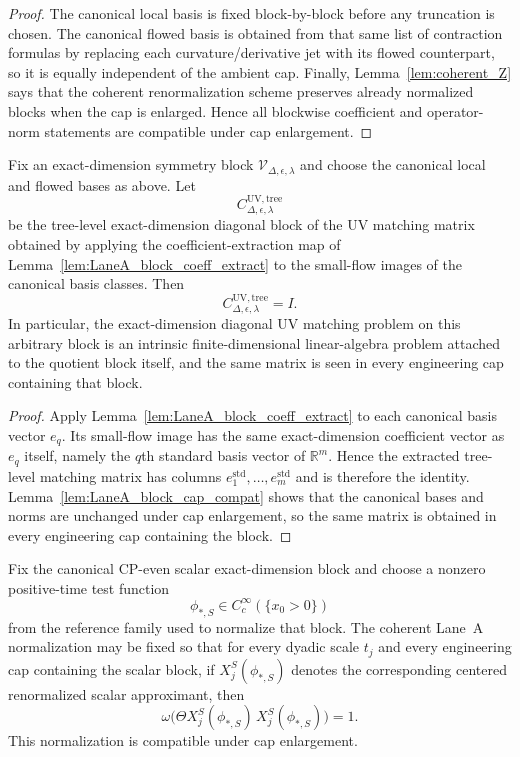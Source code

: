 \begin{proof}
The canonical local basis is fixed block-by-block before any truncation is chosen.
The canonical flowed basis is obtained from that same list of contraction formulas by replacing each curvature/derivative jet with its flowed counterpart, so it is equally independent of the ambient cap.
Finally, Lemma~\ref{lem:coherent_Z} says that the coherent renormalization scheme preserves already normalized blocks when the cap is enlarged.
Hence all blockwise coefficient and operator-norm statements are compatible under cap enlargement.
\end{proof}

\begin{theorem}\label{thm:LaneA_block_coefficient_theorem}
Fix an exact-dimension symmetry block $\mathscr V_{\Delta,\epsilon,\lambda}$ and choose the canonical local and flowed bases as above.
Let
\[
C^{\mathrm{UV,tree}}_{\Delta,\epsilon,\lambda}
\]
be the tree-level exact-dimension diagonal block of the UV matching matrix obtained by applying the coefficient-extraction map of
Lemma~\ref{lem:LaneA_block_coeff_extract} to the small-flow images of the canonical basis classes.
Then
\[
C^{\mathrm{UV,tree}}_{\Delta,\epsilon,\lambda}=I.
\]
In particular, the exact-dimension diagonal UV matching problem on this arbitrary block is an intrinsic finite-dimensional linear-algebra problem attached to the quotient block itself,
and the same matrix is seen in every engineering cap containing that block.
\end{theorem}

\begin{proof}
Apply Lemma~\ref{lem:LaneA_block_coeff_extract} to each canonical basis vector $e_q$.
Its small-flow image has the same exact-dimension coefficient vector as $e_q$ itself, namely the $q$th standard basis vector of $\mathbb R^m$.
Hence the extracted tree-level matching matrix has columns $e_1^{\mathrm{std}},\dots,e_m^{\mathrm{std}}$ and is therefore the identity.
Lemma~\ref{lem:LaneA_block_cap_compat} shows that the canonical bases and norms are unchanged under cap enlargement,
so the same matrix is obtained in every engineering cap containing the block.
\end{proof}


\begin{lemma}\label{lem:LaneA_scalar_reference_norm}
Fix the canonical CP-even scalar exact-dimension block and choose a nonzero positive-time test function
\[
\phi_{\ast,S}\in C_c^{\infty}(\{x_0>0\})
\]
from the reference family used to normalize that block.
The coherent Lane~A normalization may be fixed so that for every dyadic scale $t_j$ and every engineering cap containing the scalar block,
if $X^{S}_j(\phi_{\ast,S})$ denotes the corresponding centered renormalized scalar approximant, then
\begin{equation}\label{eq:LaneA_scalar_ref_norm}
\omega\big(\Theta X^{S}_j(\phi_{\ast,S})\,X^{S}_j(\phi_{\ast,S})\big)=1.
\end{equation}
This normalization is compatible under cap enlargement.
\end{lemma}

